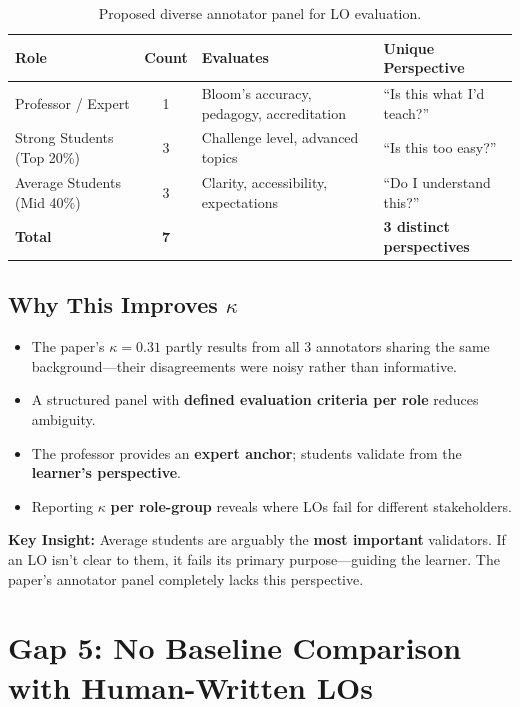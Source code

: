 \documentclass[11pt,a4paper]{article}
\begin{document}
\begin{table}[H]
\centering
\caption{Proposed diverse annotator panel for LO evaluation.}
\label{tab:annotators}
\begin{tabular}{@{}lcll@{}}
\toprule
\textbf{Role} & \textbf{Count} & \textbf{Evaluates} & \textbf{Unique Perspective} \\
\midrule
Professor / Expert & 1 & Bloom's accuracy, pedagogy, accreditation & ``Is this what I'd teach?'' \\
Strong Students (Top 20\%) & 3 & Challenge level, advanced topics & ``Is this too easy?'' \\
Average Students (Mid 40\%) & 3 & Clarity, accessibility, expectations & ``Do I understand this?'' \\
\midrule
\textbf{Total} & \textbf{7} & & \textbf{3 distinct perspectives} \\
\bottomrule
\end{tabular}
\end{table}

\subsection{Why This Improves $\kappa$}
\begin{itemize}[nosep]
    \item The paper's $\kappa = 0.31$ partly results from all 3 annotators sharing the same background---their disagreements were noisy rather than informative.
    \item A structured panel with \textbf{defined evaluation criteria per role} reduces ambiguity.
    \item The professor provides an \textbf{expert anchor}; students validate from the \textbf{learner's perspective}.
    \item Reporting $\kappa$ \textbf{per role-group} reveals where LOs fail for different stakeholders.
\end{itemize}

\begin{warnbox}
\textbf{Key Insight:} Average students are arguably the \textbf{most important} validators. If an LO isn't clear to them, it fails its primary purpose---guiding the learner. The paper's annotator panel completely lacks this perspective.
\end{warnbox}

\section{Gap 5: No Baseline Comparison with Human-Written LOs}
\end{document}
